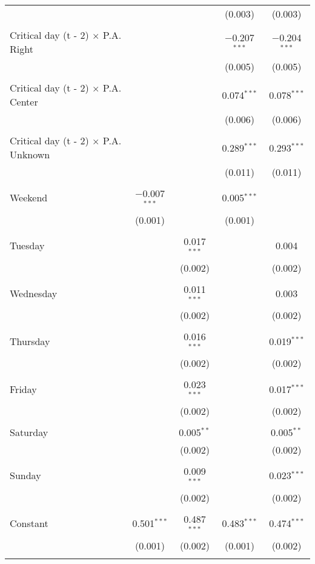 \documentclass[
]{article}
\begin{document}
\begin{table}[!htbp]
{\begin{tabular}{@{\extracolsep{5pt}}lcccc}
  &  &  & (0.003) & (0.003) \\ 
  & & & & \\ 
 Critical day (t - 2) $\times$ P.A. Right &  &  & $-$0.207$^{***}$ & $-$0.204$^{***}$ \\ 
  &  &  & (0.005) & (0.005) \\ 
  & & & & \\ 
 Critical day (t - 2) $\times$ P.A. Center &  &  & 0.074$^{***}$ & 0.078$^{***}$ \\ 
  &  &  & (0.006) & (0.006) \\ 
  & & & & \\ 
 Critical day (t - 2) $\times$ P.A. Unknown &  &  & 0.289$^{***}$ & 0.293$^{***}$ \\ 
  &  &  & (0.011) & (0.011) \\ 
  & & & & \\ 
 Weekend & $-$0.007$^{***}$ &  & 0.005$^{***}$ &  \\ 
  & (0.001) &  & (0.001) &  \\ 
  & & & & \\ 
 Tuesday &  & 0.017$^{***}$ &  & 0.004 \\ 
  &  & (0.002) &  & (0.002) \\ 
  & & & & \\ 
 Wednesday &  & 0.011$^{***}$ &  & 0.003 \\ 
  &  & (0.002) &  & (0.002) \\ 
  & & & & \\ 
 Thursday &  & 0.016$^{***}$ &  & 0.019$^{***}$ \\ 
  &  & (0.002) &  & (0.002) \\ 
  & & & & \\ 
 Friday &  & 0.023$^{***}$ &  & 0.017$^{***}$ \\ 
  &  & (0.002) &  & (0.002) \\ 
  & & & & \\ 
 Saturday &  & 0.005$^{**}$ &  & 0.005$^{**}$ \\ 
  &  & (0.002) &  & (0.002) \\ 
  & & & & \\ 
 Sunday &  & 0.009$^{***}$ &  & 0.023$^{***}$ \\ 
  &  & (0.002) &  & (0.002) \\ 
  & & & & \\ 
 Constant & 0.501$^{***}$ & 0.487$^{***}$ & 0.483$^{***}$ & 0.474$^{***}$ \\ 
  & (0.001) & (0.002) & (0.001) & (0.002) \\ 
  & & & & \\ 

\end{tabular}}
\end{table}
\end{document}
